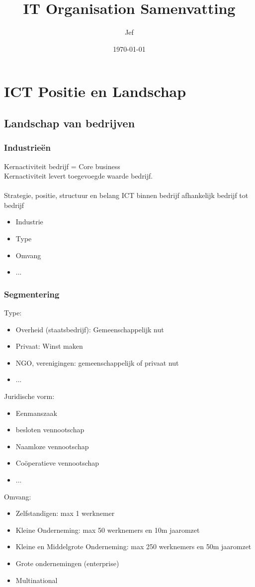 \documentclass{article}
\begin{document}
\title{IT Organisation Samenvatting}
\author{Jef}
\date{\today}
\maketitle
\newpage
\tableofcontents
\newpage
\section{ICT Positie en Landschap}
\subsection{Landschap van bedrijven}
\subsubsection{Industrieën}
Kernactiviteit bedrijf {=} Core business\\
Kernactiviteit levert toegevoegde waarde bedrijf.\\
\\
Strategie, positie, structuur en belang ICT binnen bedrijf afhankelijk bedrijf tot bedrijf\\
\begin{itemize}
\item{Industrie}
\item{Type}
\item{Omvang}
\item{...}
\end{itemize}
\subsubsection{Segmentering}
Type:
\begin{itemize}
\item{Overheid (staatsbedrijf): Gemeenschappelijk nut}
\item{Privaat: Winst maken}
\item{NGO, verenigingen: gemeenschappelijk of privaat nut}
\item{...}
\end{itemize}
Juridische vorm:
\begin{itemize}
\item{Eenmanszaak}
\item{besloten vennootschap}
\item{Naamloze vennootschap}
\item{Coöperatieve vennootschap}
\item{...}
\end{itemize}
Omvang:
\begin{itemize}
\item{Zelfstandigen: max 1 werknemer}
\item{Kleine Onderneming: max 50 werknemers en 10m jaaromzet}
\item{Kleine en Middelgrote Onderneming: max 250 werknemers en 50m jaaromzet}
\item{Grote ondernemingen (enterprise)}
\item{Multinational}
\end{itemize}
\end{document}
